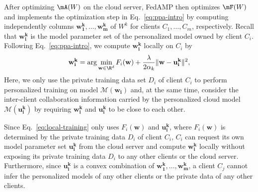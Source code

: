 After optimizing $\mA(W)$ on the cloud server, FedAMP then optimizes $\mF(W)$ and implements the optimization step in Eq.~\eqref{eq:ppa-intro} by computing independently columns $\mathbf{w_1^k}, \ldots, \mathbf{w_m^k}$ of $W^k$ for clients $C_1, \ldots, C_m$, respectively.
%
Recall that $\mathbf{w_i^k}$ is the model parameter set of the personalized model owned by client $C_i$. Following Eq.~\eqref{eq:ppa-intro}, we compute $\mathbf{w_i^k}$ locally on $C_i$ by 
\begin{equation}
\label{eq:local-training}
\mathbf{w_i^{k}} = \arg\min_{\mathbf{w}\in\R^d} F_i(\mathbf{w}) + \frac{\lambda}{2\alpha_{k}}\|\mathbf{w} - \mathbf{u_i^{k}}\|^2,
\end{equation}
Here, we only use the private training data set $D_i$ of client $C_i$ to perform personalized training on model $\mathcal{M}(\mathbf{w_i})$ and, at the same time, consider the inter-client collaboration information carried by the personalized cloud model $\mathcal{M}(\mathbf{u_i^k})$ by requiring $\mathbf{w_i^k}$ and $\mathbf{u_i^k}$ to be close to each other.



Since Eq.~\eqref{eq:local-training} only uses $F_i(\mathbf{w})$ and $\mathbf{u_i^k}$, where $F_i(\mathbf{w})$ is determined by the private training data $D_i$ of client $C_i$, $C_i$ can request its own model parameter set $\mathbf{u_i^k}$ from the cloud server and compute $\mathbf{w_i^k}$ locally without exposing its private training data $D_i$ to any other clients or the cloud server. 
%
Furthermore, since $\mathbf{u_i^k}$ is a convex combination of $\mathbf{w_1^k}, \ldots, \mathbf{w_m^k}$, a client $C_j$ cannot infer the personalized models of any other clients or the private data of any other clients.














